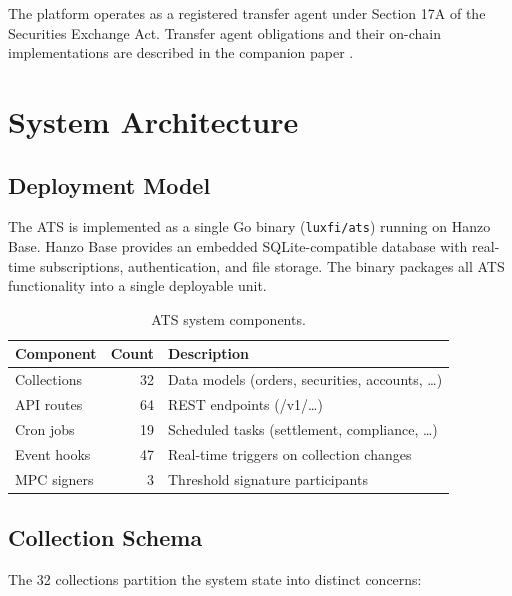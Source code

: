 \documentclass[11pt,a4paper]{article}
\begin{document}
The platform operates as a registered transfer agent under Section 17A of the Securities Exchange Act. Transfer agent obligations and their on-chain implementations are described in the companion paper \cite{lux-transfer-agent}.

\section{System Architecture}\label{sec:architecture}

\subsection{Deployment Model}

The ATS is implemented as a single Go binary (\texttt{luxfi/ats}) running on Hanzo Base. Hanzo Base provides an embedded SQLite-compatible database with real-time subscriptions, authentication, and file storage. The binary packages all ATS functionality into a single deployable unit.

\begin{table}[H]
\centering
\caption{ATS system components.}
\label{tab:components}
\begin{tabular}{lrl}
\toprule
\textbf{Component} & \textbf{Count} & \textbf{Description} \\
\midrule
Collections & 32 & Data models (orders, securities, accounts, \ldots) \\
API routes & 64 & REST endpoints (/v1/\ldots) \\
Cron jobs & 19 & Scheduled tasks (settlement, compliance, \ldots) \\
Event hooks & 47 & Real-time triggers on collection changes \\
MPC signers & 3 & Threshold signature participants \\
\bottomrule
\end{tabular}
\end{table}

\subsection{Collection Schema}

The 32 collections partition the system state into distinct concerns:
\end{document}
